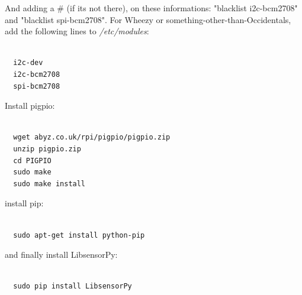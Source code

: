 \documentclass{acm_proc_article-sp}
\begin{document}
And adding a \# (if its not there), on these informations: "blacklist i2c-bcm2708" and "blacklist spi-bcm2708".
\newline
\newline
For Wheezy or something-other-than-Occidentals, add the following lines to \textit{/etc/modules}: 
\renewcommand{\theFancyVerbLine}{
  \sffamily\textcolor[rgb]{0.5,0.5,0.5}{\scriptsize\arabic{FancyVerbLine}}}
\begin{verbatim}

  i2c-dev
  i2c-bcm2708
  spi-bcm2708	

\end{verbatim}

Install pigpio:
\begin{verbatim}

  wget abyz.co.uk/rpi/pigpio/pigpio.zip
  unzip pigpio.zip
  cd PIGPIO
  sudo make
  sudo make install	
\end{verbatim}

install pip:
\begin{verbatim}

  sudo apt-get install python-pip
\end{verbatim}

and finally install LibsensorPy:
\begin{verbatim}

  sudo pip install LibsensorPy
\end{verbatim}
\end{document}
